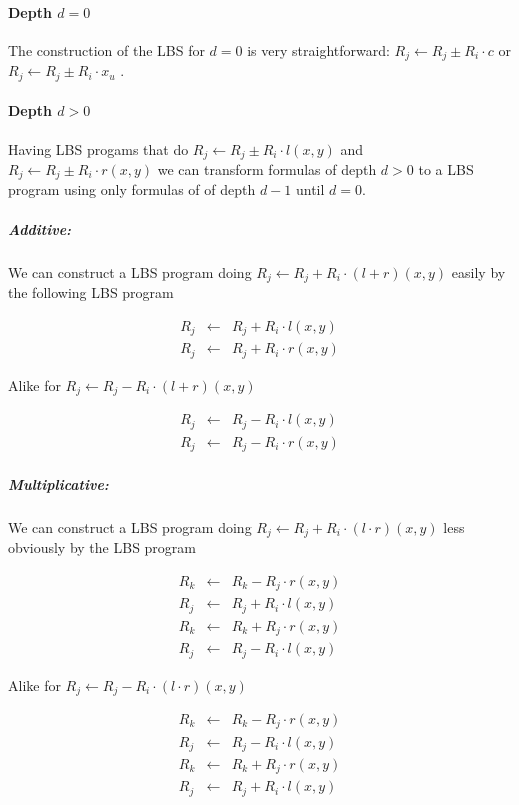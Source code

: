 \documentclass[12pt, a4paper]{article}
\begin{document}
\paragraph{Depth $d = 0$}

The construction of the LBS for $d = 0$ is very straightforward:
$R_j \leftarrow R_j \pm R_i \cdot c$ or $R_j \leftarrow R_j \pm R_i \cdot x_u$ .


\paragraph{Depth $d > 0$}

Having LBS progams that do $R_j \leftarrow R_j \pm R_i \cdot l(x, y)$  and
$R_j \leftarrow R_j \pm R_i \cdot r(x, y)$ we can
transform formulas of depth $d > 0$ to a LBS program using only formulas of
of depth $d - 1$ until $d = 0$.

\subparagraph{Additive:} We can construct a LBS program doing $R_j \leftarrow
R_j + R_i \cdot (l + r)(x, y)$ easily by the following LBS program

\begin{eqnarray}
R_j & \leftarrow & R_j + R_i \cdot l(x, y) \\
R_j & \leftarrow & R_j + R_i \cdot r(x, y)
\end{eqnarray}

Alike for $R_j \leftarrow R_j - R_i \cdot (l + r)(x, y)$

\begin{eqnarray}
R_j & \leftarrow & R_j - R_i \cdot l(x, y) \\
R_j & \leftarrow & R_j - R_i \cdot r(x, y)
\end{eqnarray}


\subparagraph{Multiplicative:} We can construct a LBS program doing $R_j
\leftarrow R_j + R_i \cdot (l \cdot r)(x, y)$ less obviously by the LBS program

\begin{eqnarray}
R_k & \leftarrow & R_k - R_j \cdot r(x, y) \\
R_j & \leftarrow & R_j + R_i \cdot l(x, y) \\
R_k & \leftarrow & R_k + R_j \cdot r(x, y) \\
R_j & \leftarrow & R_j - R_i \cdot l(x, y)
\end{eqnarray}

Alike for $R_j \leftarrow R_j - R_i \cdot (l \cdot r)(x, y)$

\begin{eqnarray}
R_k & \leftarrow & R_k - R_j \cdot r(x, y) \\
R_j & \leftarrow & R_j - R_i \cdot l(x, y) \\
R_k & \leftarrow & R_k + R_j \cdot r(x, y) \\
R_j & \leftarrow & R_j + R_i \cdot l(x, y)
\end{eqnarray}
\end{document}
